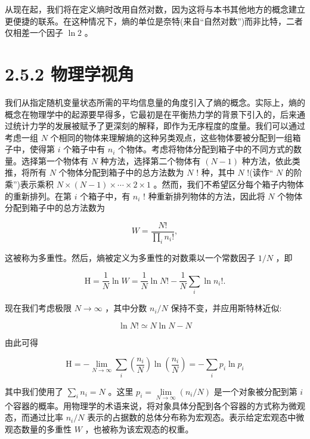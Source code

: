 \documentclass[10pt]{article}
\begin{document}
从现在起，我们将在定义熵时改用自然对数，因为这将与本书其他地方的概念建立更便捷的联系。在这种情况下，熵的单位是奈特(来自“自然对数”)而非比特，二者仅相差一个因子 \(\ln 2\) 。

\section*{2.5.2 物理学视角}

我们从指定随机变量状态所需的平均信息量的角度引入了熵的概念。实际上，熵的概念在物理学中的起源要早得多，它最初是在平衡热力学的背景下引入的，后来通过统计力学的发展被赋予了更深刻的解释，即作为无序程度的度量。我们可以通过考虑一组 \(N\) 个相同的物体来理解熵的这种另类观点，这些物体要被分配到一组箱子中，使得第 \(i\) 个箱子中有 \({n}_{i}\) 个物体。考虑将物体分配到箱子中的不同方式的数量。选择第一个物体有 \(N\) 种方法，选择第二个物体有 \(\left( {N - 1}\right)\) 种方法，依此类推，将所有 \(N\) 个物体分配到箱子中的总方法数为 \(N\) ! 种，其中 \(N\) !(读作“ \(N\) 的阶乘”)表示乘积 \(N \times  \left( {N - 1}\right)  \times  \cdots  \times  2 \times  1\) 。然而，我们不希望区分每个箱子内物体的重新排列。在第 \(i\) 个箱子中，有 \({n}_{i}\) ! 种重新排列物体的方法，因此将 \(N\) 个物体分配到箱子中的总方法数为

\[
W = \frac{N!}{\mathop{\prod }\limits_{i}{n}_{i}!}, \tag{2.82}
\]

这被称为多重性。然后，熵被定义为多重性的对数乘以一个常数因子 \(1/N\) ，即

\[
\mathrm{H} = \frac{1}{N}\ln W = \frac{1}{N}\ln N! - \frac{1}{N}\mathop{\sum }\limits_{i}\ln {n}_{i}!. \tag{2.83}
\]

现在我们考虑极限 \(N \rightarrow  \infty\) ，其中分数 \({n}_{i}/N\) 保持不变，并应用斯特林近似:

\[
\ln N! \simeq  N\ln N - N \tag{2.84}
\]

由此可得

\[
\mathrm{H} =  - \mathop{\lim }\limits_{{N \rightarrow  \infty }}\mathop{\sum }\limits_{i}\left( \frac{{n}_{i}}{N}\right) \ln \left( \frac{{n}_{i}}{N}\right)  =  - \mathop{\sum }\limits_{i}{p}_{i}\ln {p}_{i} \tag{2.85}
\]

其中我们使用了 \(\mathop{\sum }\limits_{i}{n}_{i} = N\) 。这里 \({p}_{i} = \mathop{\lim }\limits_{{N \rightarrow  \infty }}\left( {{n}_{i}/N}\right)\) 是一个对象被分配到第 \(i\) 个容器的概率。用物理学的术语来说，将对象具体分配到各个容器的方式称为微观态，而通过比率 \({n}_{i}/N\) 表示的占据数的总体分布称为宏观态。表示给定宏观态中微观态数量的多重性 \(W\) ，也被称为该宏观态的权重。
\end{document}
